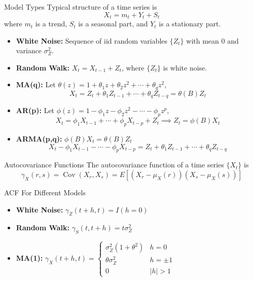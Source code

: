 \documentclass{article}
\title{}
\DeclareMathOperator{\Cov}{Cov}
\begin{document}

\begin{multicols*}{3}
\begin{blackbox}{Model Types}
    Typical structure of a time series is 
    \[X_t = m_t + Y_t + S_t\]
    where $m_t$ is a trend, $S_t$ is a seasonal part, and $Y_t$ is a stationary part.
    \begin{itemize}[leftmargin=5pt]
        \item \textbf{White Noise:} Sequence of iid random variables $\{Z_t\}$ with mean 0 and variance $\sigma_Z^2$.
        \item \textbf{Random Walk:} $X_t = X_{t-1} + Z_t$, where $\{Z_t\}$ is white noise.
        \item \textbf{MA(q):} Let $\theta(z) = 1 + \theta_1z + \theta_2z^2 + \cdots + \theta_qz^2$, 
        \[X_t = Z_t + \theta_1Z_{t-1} + \cdots + \theta_qZ_{t-q} = \theta(B)Z_t\]
        \item \textbf{AR(p):} Let $\phi(z) = 1-\phi_1z - \phi_2z^2 - \cdots - \phi_pz^p$,
        \[X_t = \phi_1X_{t-1} + \cdots + \phi_pX_{t-p} + Z_t \implies Z_t = \phi(B)X_t\]
        \item \textbf{ARMA(p,q):} $\phi(B)X_t = \theta(B)Z_t$
        \[X_t - \phi_1X_{t-1} - \cdots - \phi_pX_{t-p} = Z_t + \theta_1Z_{t-1} + \cdots + \theta_qZ_{t-q}\]
    \end{itemize}
\end{blackbox}
\begin{blackbox}{Autocovariance Functions}
    The autocovariance function of a time series $\{X_t\}$ is 
    \[\gamma_X(r,s) = \Cov(X_r, X_s) = E[(X_r - \mu_X(r))(X_s-\mu_X(s))]\]
    \begin{bluebox}{ACF For Different Models}
        \begin{itemize}[leftmargin=5pt]
            \item \textbf{White Noise:} $\gamma_Z(t+h,t) = I(h = 0)$
            \item \textbf{Random Walk:} $\gamma_S(t,t+h) = t\sigma_Z^2$
            \item \textbf{MA(1):} $\gamma_X(t+h,t) = \begin{cases}
                \sigma_Z^2(1+\theta^2) & h = 0\\
                \theta\sigma_Z^2 & h = \pm 1\\
                0 & |h| > 1
            \end{cases}$

\end{itemize}
\end{bluebox}
\end{blackbox}
\end{multicols*}
\end{document}
